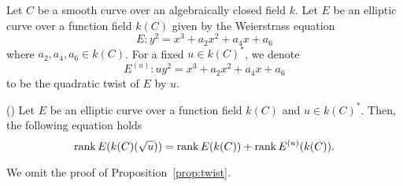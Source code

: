 \documentclass[main]{subfiles}
\begin{document}
\begin{dfn}
    Let $C$ be a smooth curve over an algebraically closed field $k$.
    Let $E$ be an elliptic curve over a function field $k(C)$ given by the Weierstrass equation
    \begin{equation*}
        E: y^{2} = x^{3} + a_{2} x^{2} + a_{4} x + a_{6}
    \end{equation*}
    where $a_{2}, a_{4}, a_{6} \in k(C)$.
    For a fixed $u \in k(C)^*$, we denote
    \begin{equation*}
        E^{(u)}: u y^{2} = x^{3} + a_{2} x^{2} + a_{4} x + a_{6}
    \end{equation*}
    to be the quadratic twist of $E$ by $u$.
\end{dfn}

\begin{prop}{(\cite[Exercise 10.16]{ref:aec})}
    \label{prop:twist}
    Let $E$ be an elliptic curve over a function field $k(C)$ and $u \in k(C)^*$.
    Then, the following equation holds
    \begin{equation*}
        \operatorname{rank} E(k(C)(\sqrt{u})) = \operatorname{rank} E(k(C)) + \operatorname{rank} E^{(u)}(k(C)).
    \end{equation*}
\end{prop}
We omit the proof of Proposition~\ref{prop:twist}.
\end{document}
